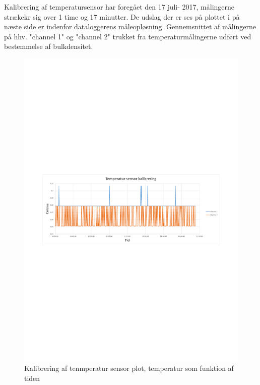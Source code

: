 \label{fig:temp_plot} 
Kalibrering af temperatursensor har foregået den 17 juli- 2017, målingerne strækekr sig over 1 time og 17 minutter. De udslag der er ses på plottet i på næste side er indenfor dataloggerens måleopløsning. Gennemsnittet af målingerne på hhv. "channel 1" og "channel 2" trukket fra temperaturmålingerne udført ved bestemmelse af bulkdensitet.
\begin{landscape}
\begin{figure}
\centering
\caption{Kalibrering af tenmperatur sensor plot, temperatur som funktion af tiden}
\includegraphics[width=1.2\textwidth]{appendix/t_sens_kal_plot}
\end{figure}
\end{landscape}
